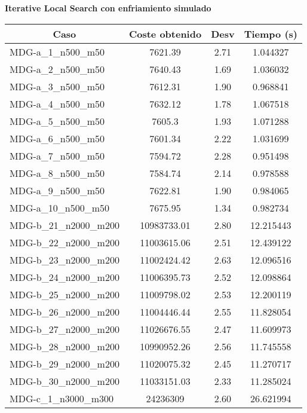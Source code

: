 \documentclass[11pt,a4paper]{article}
\begin{document}
			
\newpage		
\textbf{Iterative Local Search con enfriamiento simulado}
\begin{table}[H]
	\begin{center}
		\begin{tabular}{|l|c|c|c|} 
			\hline
			\multicolumn{1}{|c|}{\textbf{Caso}} & \textbf{Coste obtenido} & \textbf{Desv} & \textbf{Tiempo (s)} \\ \hline
					MDG-a\_1\_n500\_m50 & 7621.39 & 2.71 & 1.044327 \\ \hline
					MDG-a\_2\_n500\_m50 & 7640.43 & 1.69 & 1.036032 \\ \hline
					MDG-a\_3\_n500\_m50 & 7612.31 & 1.90 & 0.968841 \\ \hline
					MDG-a\_4\_n500\_m50 & 7632.12 & 1.78 & 1.067518 \\ \hline
					MDG-a\_5\_n500\_m50 & 7605.3 & 1.93 & 1.071288 \\ \hline
					MDG-a\_6\_n500\_m50 & 7601.34 & 2.22 & 1.031699 \\ \hline
					MDG-a\_7\_n500\_m50 & 7594.72 & 2.28 & 0.951498 \\ \hline
					MDG-a\_8\_n500\_m50 & 7584.74 & 2.14 & 0.978588 \\ \hline
					MDG-a\_9\_n500\_m50 & 7622.81 & 1.90 & 0.984065 \\ \hline
					MDG-a\_10\_n500\_m50 & 7675.95 & 1.34 & 0.982734 \\ \hline
					MDG-b\_21\_n2000\_m200 & 10983733.01 & 2.80 & 12.215443 \\ \hline
					MDG-b\_22\_n2000\_m200 & 11003615.06 & 2.51 & 12.439122 \\ \hline
					MDG-b\_23\_n2000\_m200 & 11002424.42 & 2.63 & 12.096516 \\ \hline
					MDG-b\_24\_n2000\_m200 & 11006395.73 & 2.52 & 12.098864 \\ \hline
					MDG-b\_25\_n2000\_m200 & 11009798.02 & 2.53 & 12.200119 \\ \hline
					MDG-b\_26\_n2000\_m200 & 11004446.44 & 2.55 & 11.828054 \\ \hline
					MDG-b\_27\_n2000\_m200 & 11026676.55 & 2.47 & 11.609973 \\ \hline
					MDG-b\_28\_n2000\_m200 & 10990952.26 & 2.56 & 11.745558 \\ \hline
					MDG-b\_29\_n2000\_m200 & 11020075.32 & 2.45 & 11.270717 \\ \hline
					MDG-b\_30\_n2000\_m200 & 11033151.03 & 2.33 & 11.285024 \\ \hline
					MDG-c\_1\_n3000\_m300 & 24236309 & 2.60 & 26.621994 \\ \hline

\end{tabular}
\end{center}
\end{table}
\end{document}

